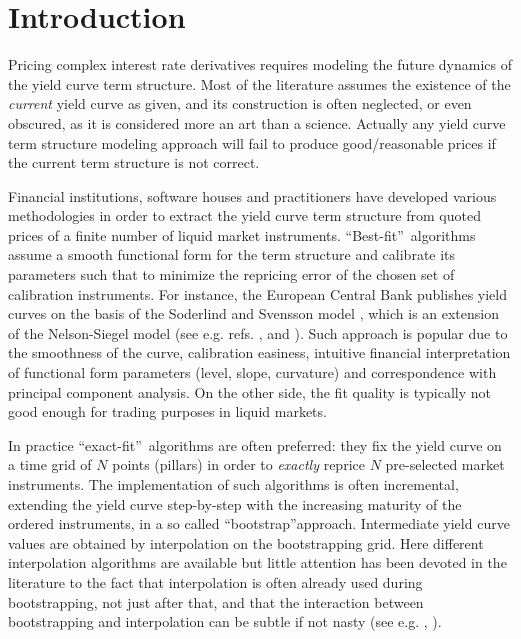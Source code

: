 \documentclass[11pt,reqno]{amsart}
\begin{document}
\section{Introduction}
\label{sec:Intro}
Pricing complex interest rate derivatives requires modeling the future dynamics of the yield curve term structure. Most of the literature assumes the existence of the \emph{current} yield curve as given, and its construction is often neglected, or even obscured, as it is considered more an art than a science. Actually any yield curve term structure modeling approach will fail to produce good/reasonable prices if the current term structure is not correct.
\par
Financial institutions, software houses and practitioners have developed various methodologies in order to extract the yield curve term structure from quoted prices of a finite number of liquid market instruments.
\textquotedblleft Best-fit\textquotedblright\ algorithms assume a smooth functional form for the term structure and calibrate its parameters such that to minimize the repricing error of the chosen set of calibration instruments. For instance, the European Central Bank publishes yield curves on the basis of the Soderlind and Svensson model \cite{SodSwe1997}, which is an extension of the Nelson-Siegel model (see e.g. refs. \cite{NelSie1987}, \cite{ChrDie07} and \cite{Cor08}). Such approach is popular due to the smoothness of the curve, calibration easiness, intuitive financial interpretation of functional form parameters (level, slope, curvature) and correspondence with principal component analysis. On the other side, the fit quality is typically not good enough for trading purposes in liquid markets.
\par
In practice \textquotedblleft exact-fit\textquotedblright\ algorithms are often preferred: they fix the yield curve on a time grid of $N$ points (pillars) in order to \emph{exactly} reprice $N$ pre-selected market instruments. The implementation of such algorithms is often incremental, extending the yield curve step-by-step with the increasing maturity of the ordered instruments, in a so called \textquotedblleft bootstrap\textquotedblright approach. Intermediate yield curve values are obtained by interpolation on the bootstrapping grid. Here different interpolation algorithms are available but little attention has been devoted in the literature to the fact that interpolation is often already used during bootstrapping, not just after that, and that the interaction between bootstrapping and interpolation can be subtle if not nasty (see e.g. \cite{HagWes06}, \cite{HagWes08}).
\end{document}
